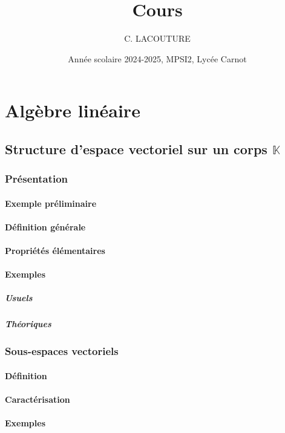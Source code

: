 \documentclass[12pt,a4paper,french]{book}
\title{Cours}
\author{C. LACOUTURE}
\date{Année scolaire 2024-2025, MPSI2, Lycée Carnot}
\begin{document}
\maketitle
\tableofcontents

\part{Algèbre linéaire}

\chapter{Structure d'espace vectoriel sur un corps $\mathbb{K}$}
	\section{Présentation}
		\subsection{Exemple préliminaire}
		\subsection{Définition générale}
		\subsection{Propriétés élémentaires}
		\subsection{Exemples}
			\subsubsection{Usuels}
			\subsubsection{Théoriques}
	\section{Sous-espaces vectoriels}
		\subsection{Définition}
		\subsection{Caractérisation}
		\subsection{Exemples}
\end{document}
